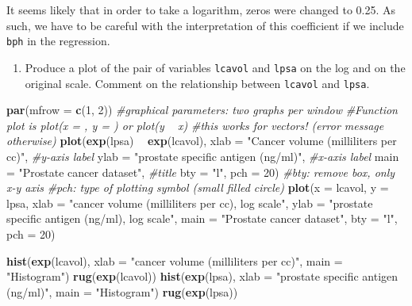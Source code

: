 \documentclass[]{book}
\newenvironment{Shaded}{\begin{snugshade}}{\end{snugshade}}
\newcommand{\CommentTok}[1]{\textcolor[rgb]{0.56,0.35,0.01}{\textit{#1}}}
\newcommand{\DataTypeTok}[1]{\textcolor[rgb]{0.13,0.29,0.53}{#1}}
\newcommand{\DecValTok}[1]{\textcolor[rgb]{0.00,0.00,0.81}{#1}}
\newcommand{\KeywordTok}[1]{\textcolor[rgb]{0.13,0.29,0.53}{\textbf{#1}}}
\newcommand{\NormalTok}[1]{#1}
\newcommand{\OperatorTok}[1]{\textcolor[rgb]{0.81,0.36,0.00}{\textbf{#1}}}
\newcommand{\StringTok}[1]{\textcolor[rgb]{0.31,0.60,0.02}{#1}}
\providecommand{\tightlist}{%
  \setlength{\itemsep}{0pt}\setlength{\parskip}{0pt}}
\theoremstyle{definition}
\theoremstyle{definition}
\theoremstyle{definition}
\theoremstyle{remark}
\begin{document}
It seems likely that in order to take a logarithm, zeros were changed to 0.25. As such, we have to be careful with the interpretation of this coefficient if we include \texttt{bph} in the regression.

\begin{enumerate}
\def\labelenumi{\alph{enumi}.}
\setcounter{enumi}{1}
\tightlist
\item
  Produce a plot of the pair of variables \texttt{lcavol} and \texttt{lpsa} on the log and on the original scale. Comment on the relationship between \texttt{lcavol} and \texttt{lpsa}.
\end{enumerate}

\begin{Shaded}
\begin{Highlighting}[]
\KeywordTok{par}\NormalTok{(}\DataTypeTok{mfrow =} \KeywordTok{c}\NormalTok{(}\DecValTok{1}\NormalTok{, }\DecValTok{2}\NormalTok{)) }\CommentTok{#graphical parameters: two graphs per window}
\CommentTok{#Function plot is plot(x = , y = ) or plot(y ~ x)}
\CommentTok{#this works for vectors! (error message otherwise)}
\KeywordTok{plot}\NormalTok{(}\KeywordTok{exp}\NormalTok{(lpsa) }\OperatorTok{~}\StringTok{ }\KeywordTok{exp}\NormalTok{(lcavol),}
\DataTypeTok{xlab =} \StringTok{"Cancer volume (milliliters per cc)"}\NormalTok{, }\CommentTok{#y-axis label}
\DataTypeTok{ylab =} \StringTok{"prostate specific antigen (ng/ml)"}\NormalTok{, }\CommentTok{#x-axis label}
\DataTypeTok{main =} \StringTok{"Prostate cancer dataset"}\NormalTok{, }\CommentTok{#title}
\DataTypeTok{bty =} \StringTok{"l"}\NormalTok{, }\DataTypeTok{pch =} \DecValTok{20}\NormalTok{) }\CommentTok{#bty: remove box, only x-y axis}
\CommentTok{#pch: type of plotting symbol (small filled circle)}
\KeywordTok{plot}\NormalTok{(}\DataTypeTok{x =}\NormalTok{ lcavol, }\DataTypeTok{y =}\NormalTok{ lpsa,}
\DataTypeTok{xlab =} \StringTok{"cancer volume (milliliters per cc), log scale"}\NormalTok{,}
\DataTypeTok{ylab =} \StringTok{"prostate specific antigen (ng/ml), log scale"}\NormalTok{, }
\DataTypeTok{main =} \StringTok{"Prostate cancer dataset"}\NormalTok{,}
\DataTypeTok{bty =} \StringTok{"l"}\NormalTok{, }\DataTypeTok{pch =} \DecValTok{20}\NormalTok{)}

\KeywordTok{hist}\NormalTok{(}\KeywordTok{exp}\NormalTok{(lcavol), }\DataTypeTok{xlab =} \StringTok{"cancer volume (milliliters per cc)"}\NormalTok{, }\DataTypeTok{main =} \StringTok{"Histogram"}\NormalTok{)}
\KeywordTok{rug}\NormalTok{(}\KeywordTok{exp}\NormalTok{(lcavol))}
\KeywordTok{hist}\NormalTok{(}\KeywordTok{exp}\NormalTok{(lpsa), }\DataTypeTok{xlab =} \StringTok{"prostate specific antigen (ng/ml)"}\NormalTok{, }\DataTypeTok{main =} \StringTok{"Histogram"}\NormalTok{)}
\KeywordTok{rug}\NormalTok{(}\KeywordTok{exp}\NormalTok{(lpsa))}
\end{Highlighting}
\end{Shaded}
\end{document}
